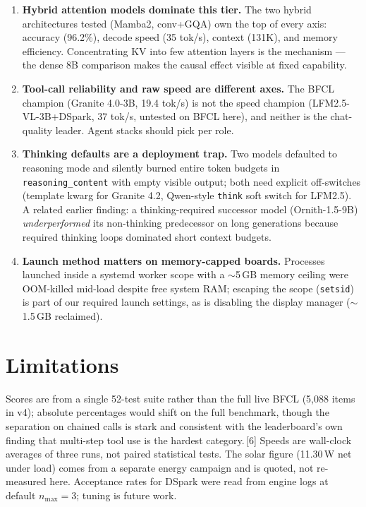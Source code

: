 \documentclass[10pt]{article}
\begin{document}
\begin{enumerate}
\item \textbf{Hybrid attention models dominate this tier.} The two
hybrid architectures tested (Mamba2, conv+GQA) own the top of every axis:
accuracy (96.2\%), decode speed (35 tok/s), context (131K), and memory
efficiency. Concentrating KV into few attention layers is the mechanism
--- the dense 8B comparison makes the causal effect visible at fixed
capability.
\item \textbf{Tool-call reliability and raw speed are different axes.}
The BFCL champion (Granite 4.0-3B, 19.4 tok/s) is not the speed
champion (LFM2.5-VL-3B+DSpark, 37 tok/s, untested on BFCL here), and
neither is the chat-quality leader. Agent stacks should pick per role.
\item \textbf{Thinking defaults are a deployment trap.} Two models
defaulted to reasoning mode and silently burned entire token budgets in
\texttt{reasoning\_content} with empty visible output; both need explicit
off-switches (template kwarg for Granite 4.2, Qwen-style \texttt{think}
soft switch for LFM2.5). A related earlier finding: a thinking-required
successor model (Ornith-1.5-9B) \emph{underperformed} its non-thinking
predecessor on long generations because required thinking loops
dominated short context budgets.
\item \textbf{Launch method matters on memory-capped boards.} Processes
launched inside a systemd worker scope with a $\sim$5\,GB memory ceiling
were OOM-killed mid-load despite free system RAM; escaping the scope
(\texttt{setsid}) is part of our required launch settings, as is
disabling the display manager ($\sim$1.5\,GB reclaimed).
\end{enumerate}

\section{Limitations}
Scores are from a single 52-test suite rather than the full live BFCL
(5{,}088 items in v4); absolute percentages would shift on the full
benchmark, though the separation on chained calls is stark and consistent
with the leaderboard's own finding that multi-step tool use is the
hardest category.\,[6] Speeds are wall-clock averages of three runs, not
paired statistical tests. The solar figure (11.30\,W net under load)
comes from a separate energy campaign and is quoted, not re-measured
here. Acceptance rates for DSpark were read from engine logs at default
$n_{\max}{=}3$; tuning is future work.
\end{document}

